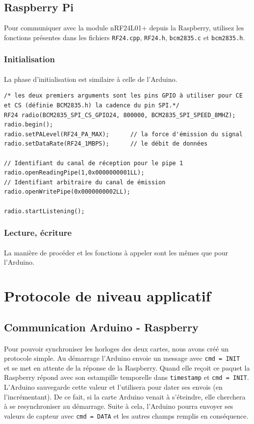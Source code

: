 \documentclass[a4paper, titlepage, oneside, 12pt]{article}%
\begin{document}
\subsection{Raspberry Pi}
Pour communiquer avec la module nRF24L01+ depuis la Raspberry, utilisez les fonctions présentes dans les fichiers \texttt{RF24.cpp}, \texttt{RF24.h}, \texttt{bcm2835.c} et \texttt{bcm2835.h}.

\subsubsection{Initialisation}
\paragraph{}
La phase d'initialisation est similaire à celle de l'Arduino. 

\begin{lstlisting}
/* les deux premiers arguments sont les pins GPIO à utiliser pour CE et CS (définie BCM2835.h) la cadence du pin SPI.*/
RF24 radio(BCM2835_SPI_CS_GPIO24, 800000, BCM2835_SPI_SPEED_8MHZ);
radio.begin();
radio.setPALevel(RF24_PA_MAX);		// la force d'émission du signal
radio.setDataRate(RF24_1MBPS);		// le débit de données

// Identifiant du canal de réception pour le pipe 1
radio.openReadingPipe(1,0x0000000001LL);		
// Identifiant arbitraire du canal de émission 
radio.openWritePipe(0x0000000002LL);

radio.startListening();
\end{lstlisting}

\subsubsection{Lecture, écriture}
\paragraph{}
La manière de procéder et les fonctions à appeler sont les mêmes que pour l'Arduino.

\section{Protocole de niveau applicatif}
\subsection{Communication Arduino - Raspberry}
\paragraph{}
Pour pouvoir synchroniser les horloges des deux cartes, nous avons créé un protocole simple.
Au démarrage l'Arduino envoie un message avec \texttt{cmd = INIT } et se met en attente de la réponse de la Raspberry. Quand elle reçoit ce paquet la Raspberry répond avec son estampille temporelle dans \texttt{timestamp} et \texttt{cmd = INIT}. L'Arduino sauvegarde cette valeur et l'utilisera pour dater ses envois (en l'incrémentant).
De ce fait, si la carte Arduino venait à s'éteindre, elle cherchera à se resynchroniser au démarrage.
Suite à cela, l'Arduino pourra envoyer ses valeurs de capteur avec \texttt{cmd = DATA} et les autres champs remplis en conséquence.
\end{document}

